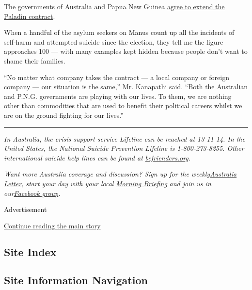 The governments of Australia and Papua New Guinea
\href{https://www.abc.net.au/news/2019-06-26/australia-and-png-agree-to-limited-extension-manus-contracts/11249702}{agree
to extend the Paladin contract}.

When a handful of the asylum seekers on Manus count up all the incidents
of self-harm and attempted suicide since the election, they tell me the
figure approaches 100 --- with many examples kept hidden because people
don't want to shame their families.

``No matter what company takes the contract --- a local company or
foreign company --- our situation is the same,'' Mr. Kanapathi said.
``Both the Australian and P.N.G. governments are playing with our lives.
To them, we are nothing other than commodities that are used to benefit
their political careers whilst we are on the ground fighting for our
lives.''

\begin{center}\rule{0.5\linewidth}{\linethickness}\end{center}

\emph{In Australia, the crisis support service Lifeline can be reached
at 13 11 14. In the United States, the National Suicide Prevention
Lifeline is 1-800-273-8255. Other international suicide help lines can
be found at}
\href{https://www.befrienders.org/}{\emph{befrienders.org}}\emph{.}

\emph{Want more Australia coverage and discussion? Sign up for the
weekly}\href{https://www.nytimes3xbfgragh.onion/newsletters/australia-letter?utm_source=ausend}{\emph{Australia
Letter}}\emph{, start your day with your local}
\href{https://www.nytimes3xbfgragh.onion/interactive/2018/briefing/global-morning-briefing-newsletter-signup.html?utm_source=ausend}{\emph{Morning
Briefing}} \emph{and join us in
our}\href{https://www.facebookcorewwwi.onion/groups/nytaustralia/}{\emph{Facebook
group}}\emph{.}

Advertisement

\protect\hyperlink{after-bottom}{Continue reading the main story}

\hypertarget{site-index}{%
\subsection{Site Index}\label{site-index}}

\hypertarget{site-information-navigation}{%
\subsection{Site Information
Navigation}\label{site-information-navigation}}

